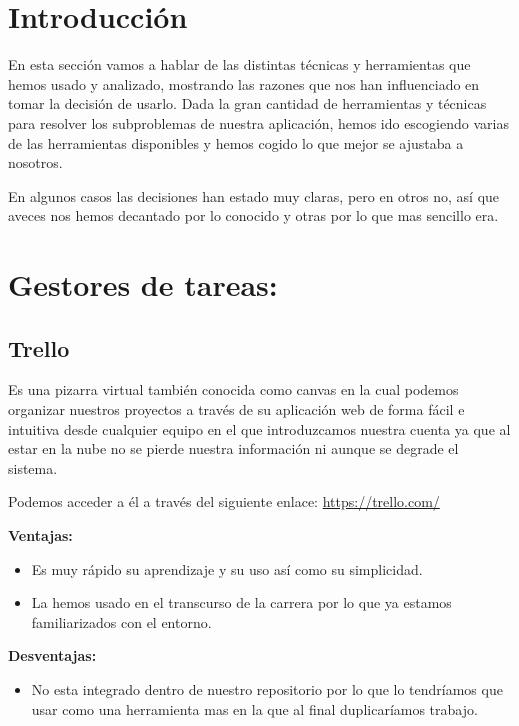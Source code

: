 
\section{Introducción}
En esta sección vamos a hablar de las distintas técnicas y herramientas que hemos usado y analizado, mostrando las razones que nos han influenciado en tomar la decisión de usarlo.
Dada la gran cantidad de herramientas y técnicas para resolver los subproblemas de nuestra aplicación, hemos ido escogiendo varias de las herramientas disponibles y hemos cogido lo que mejor se ajustaba a nosotros.

En algunos casos las decisiones han estado muy claras, pero en otros no, así que aveces nos hemos decantado por lo conocido y otras por lo que mas sencillo era.

\section{Gestores de tareas:}
\subsection{Trello}
Es una pizarra virtual también conocida como canvas en la cual podemos organizar nuestros proyectos a través de su aplicación web de forma fácil e intuitiva desde cualquier equipo en el que introduzcamos nuestra cuenta ya que al estar en la nube no se pierde nuestra información ni aunque se degrade el sistema.

Podemos acceder a él a través del siguiente enlace: 
\url{https://trello.com/}



\textbf{Ventajas:}

\begin{itemize}
\item Es muy rápido su aprendizaje y su uso así como su simplicidad.

\item La hemos usado en el transcurso de la carrera por lo que ya estamos familiarizados con el entorno.
\end{itemize}

\textbf{Desventajas:}

\begin{itemize}
\item No esta integrado dentro de nuestro repositorio por lo que lo tendríamos que usar como una herramienta mas en la que al final duplicaríamos trabajo.
\end{itemize}


